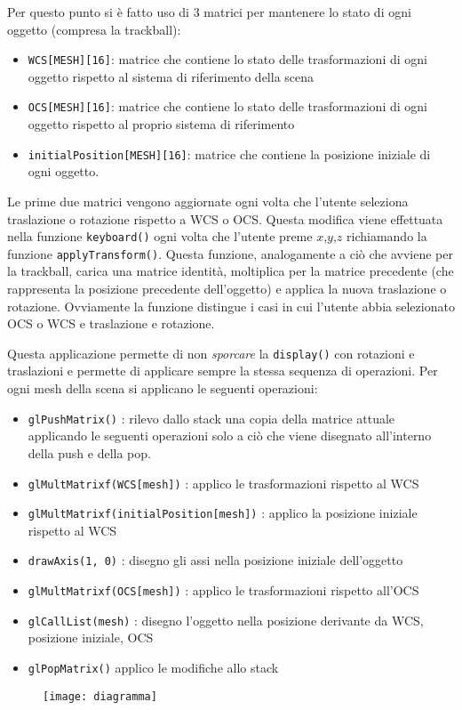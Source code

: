 Per questo punto si è fatto uso di 3 matrici per mantenere lo stato di ogni oggetto (compresa la trackball):
\begin{itemize}
  \item \texttt{WCS[MESH][16]}: matrice che contiene lo stato delle trasformazioni di ogni oggetto rispetto al sistema di riferimento della scena
  \item  \texttt{OCS[MESH][16]}: matrice che contiene lo stato delle trasformazioni di ogni oggetto rispetto al proprio sistema di riferimento
  \item  \texttt{initialPosition[MESH][16]}: matrice che contiene la posizione iniziale di ogni oggetto.
\end{itemize}

Le prime due matrici vengono aggiornate ogni volta che l'utente seleziona traslazione o rotazione rispetto a WCS o OCS. Questa modifica viene effettuata nella funzione \texttt{keyboard()} ogni volta che l'utente preme $x$,$y$,$z$ richiamando la funzione \texttt{applyTransform()}. Questa funzione, analogamente a ciò che avviene per la trackball, carica una matrice identità, moltiplica per la matrice precedente (che rappresenta la posizione precedente dell'oggetto) e applica la nuova traslazione o rotazione. Ovviamente la funzione distingue i casi in cui l'utente abbia selezionato OCS o WCS e traslazione e rotazione.

Questa applicazione permette di non \textit{sporcare} la \texttt{display()} con rotazioni e traslazioni e permette di applicare sempre la stessa sequenza di operazioni. Per ogni mesh della scena si applicano le seguenti operazioni:
\begin{itemize}
  \item \texttt{glPushMatrix()} : rilevo dallo stack una copia della matrice attuale applicando le seguenti operazioni solo a ciò che viene disegnato all'interno della push e della pop.
  \item \texttt{glMultMatrixf(WCS[mesh])} : applico le trasformazioni rispetto al WCS
  \item \texttt{glMultMatrixf(initialPosition[mesh])} : applico la posizione iniziale rispetto al WCS
  \item \texttt{drawAxis(1, 0)} : disegno gli assi nella posizione iniziale dell'oggetto
  \item \texttt{glMultMatrixf(OCS[mesh])} : applico le trasformazioni rispetto all'OCS
  \item \texttt{glCallList(mesh)} : disegno l'oggetto nella posizione derivante da WCS, posizione iniziale, OCS

  \item \texttt{glPopMatrix()} applico le modifiche allo stack
\end{itemize}
 \begin{figure}[htb]
    \centering
    \vspace{-0.7cm}
    \texttt{[image: diagramma]}
    \caption*{\label{fig:diagramma}}
    \vspace{-0.3cm}
\end{figure}

